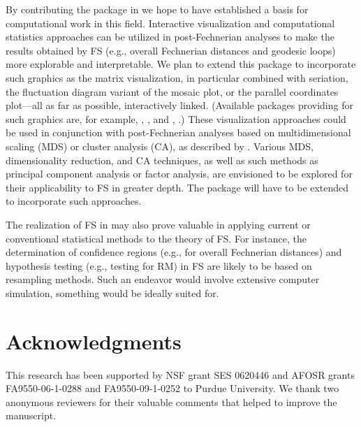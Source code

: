 \documentclass[nojss]{jss}
\begin{document}
By contributing the package  in  we hope to have established a basis for computational work in this field.
Interactive visualization and computational statistics approaches can be utilized in post-Fechnerian analyses to make the results 
obtained by FS (e.g., overall Fechnerian distances and geodesic loops) more explorable and interpretable. 
We plan to extend this package to incorporate such graphics as the matrix visualization, in particular combined with seriation, 
the fluctuation diagram variant of the mosaic plot, or the parallel coordinates plot---all as far as possible, interactively linked. 
(Available  packages providing for such graphics 
are, for example, , \citealp{seriation}, and , \citealp{iplots}.) These visualization approaches could be used in conjunction with post-Fechnerian 
analyses based on multidimensional scaling (MDS) or cluster analysis (CA), as described by \cite{DzhCol2006b}. 
Various MDS, dimensionality reduction, and CA techniques, as well as such methods as principal component analysis or factor analysis, 
are envisioned to be explored for their applicability to FS in greater depth.
The package  will have to be extended to incorporate such approaches.

The realization of FS in  may also prove valuable in applying current or conventional statistical methods 
to the theory of FS. 
For instance, the determination of confidence regions (e.g., for overall Fechnerian distances) and hypothesis testing (e.g., testing for RM) 
in FS are likely to be based on resampling methods. Such an endeavor would involve extensive computer simulation, something 
 would be ideally suited for.

\section*{Acknowledgments}

This research has been supported by NSF grant SES 0620446 and AFOSR grants FA9550-06-1-0288 and FA9550-09-1-0252 to Purdue University.
We thank two anonymous reviewers for their valuable comments that helped to improve the manuscript.


\end{document}
